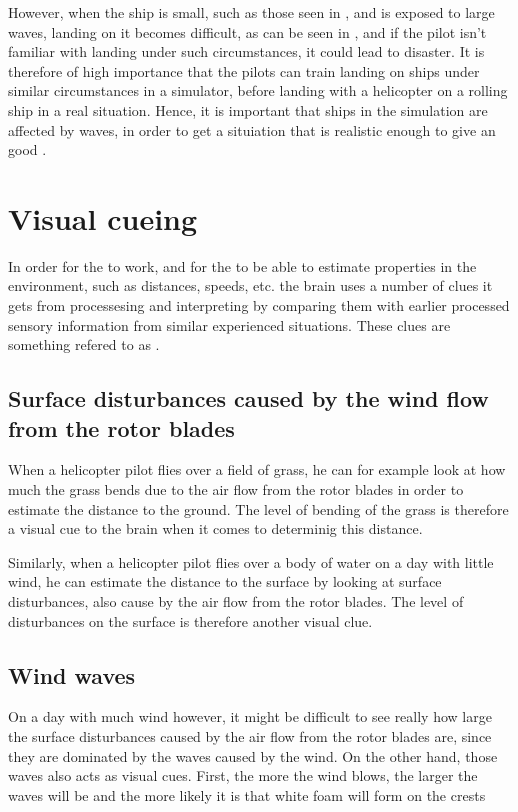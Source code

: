 However, when the ship is small, such as those seen in \citep{MrOawal2009,PrismDefence2010,KopulaDK2010}, and is exposed to large waves, landing on it becomes difficult, as can be seen in \citep{PrismDefence2010}, and if the pilot isn't familiar with landing under such circumstances, it could lead to disaster. It is therefore of high importance that the pilots can train landing on ships under similar circumstances in a simulator, before landing with a helicopter on a rolling ship in a real situation. Hence, it is important that ships in the simulation are affected by waves, in order to get a situiation that is realistic enough to give an good .

\section{Visual cueing}

In order for the  to work, and for the \brain to be able to estimate properties in the environment, such as distances, speeds, etc. the brain uses a number of clues it gets from processesing and interpreting  by comparing them with earlier processed sensory information from similar experienced situations. These clues are something refered to as .

\subsection{Surface disturbances caused by the wind flow from the rotor blades}

When a helicopter pilot flies over a field of grass, he can for example look at how much the grass bends due to the air flow from the rotor blades in order to estimate the distance to the ground. The level of bending of the grass is therefore a visual cue to the brain when it comes to determinig this distance.

Similarly, when a helicopter pilot flies over a body of water on a day with little wind, he can estimate the distance to the surface by looking at surface disturbances, also cause by the air flow from the rotor blades. The level of disturbances on the surface is therefore another visual clue.

\subsection{Wind waves}

On a day with much wind however, it might be difficult to see really how large the surface disturbances caused by the air flow from the rotor blades are, since they are dominated by the waves caused by the wind. On the other hand, those waves also acts as visual cues. First, the more the wind blows, the larger the waves will be and the more likely it is that white foam will form on the crests


